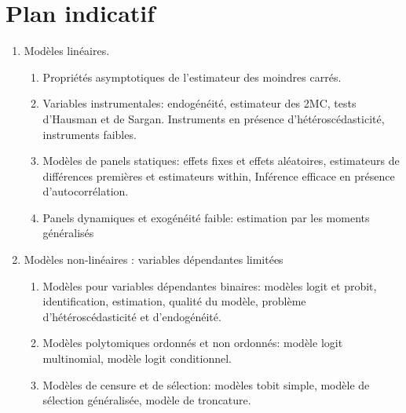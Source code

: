 \documentclass[12pt, reqno]{amsart}
\begin{document}
\section{Plan indicatif}
\begin{enumerate}
\item Modèles linéaires.
\begin{enumerate}
\item Propriétés asymptotiques de l'estimateur des moindres carrés. 
\item Variables instrumentales: endogénéité, estimateur des 2MC, tests d'Hausman et de Sargan. 
Instruments en présence d'hétéroscédasticité, instruments faibles.
\item Modèles de panels statiques: effets fixes et effets aléatoires, estimateurs de différences premières et estimateurs within, Inférence efficace en présence d'autocorrélation. 
\item Panels dynamiques et exogénéité faible: estimation par les moments généralisés
\end{enumerate}

\item Modèles non-linéaires : variables dépendantes limitées
\begin{enumerate}
\item Modèles pour variables dépendantes binaires: modèles logit et probit, identification, estimation, qualité du modèle, problème d'hétéroscédasticité et d'endogénéité.
\item Modèles polytomiques ordonnés et non ordonnés: modèle logit multinomial, modèle logit conditionnel.
\item Modèles de censure et de sélection: modèles tobit simple, modèle de sélection généralisée, modèle de troncature.
\end{enumerate}
\end{enumerate}


\end{document}
